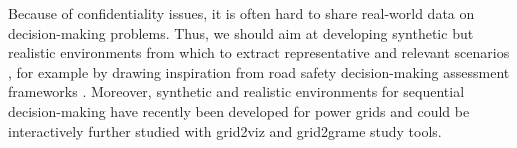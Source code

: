 \documentclass{IOS-Book-Article}
\begin{document}
 
 


Because of confidentiality issues, it is often hard to share real-world data on decision-making problems. Thus, we should aim at developing synthetic but realistic environments from which to extract representative and relevant scenarios%
, for example by drawing inspiration from road safety decision-making assessment frameworks \cite{dilemmas}.
Moreover, synthetic and realistic environments for sequential decision-making have recently been developed for power grids \cite{marot2020learning,marot2021learning,l2rpn_with_trust} and could be interactively further studied with grid2viz \cite{grid2viz} and grid2grame \cite{grid2game} study tools. %
\end{document}
